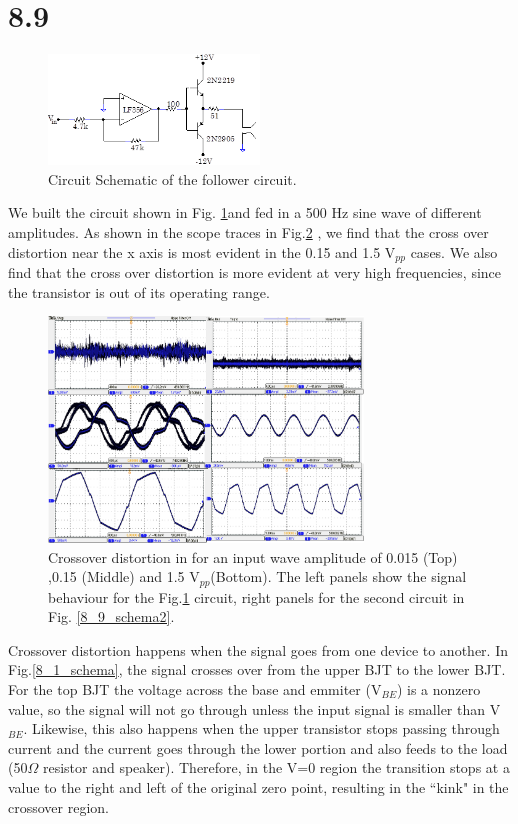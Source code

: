\documentclass[authoryear, 12pt,5p, times]{elsarticle}
\begin{document}
 \section*{8.9}
 \begin{figure}[h!]
 \centering
  \includegraphics[width=0.5\textwidth]{figure/8_9_schema.png}
\caption{Circuit Schematic of the follower circuit.}
\label{8_9_schema}
 \end{figure}
\par  We built the circuit shown in Fig. \ref{8_9_schema}and fed in a 500 Hz sine wave of different amplitudes. As shown in the scope traces in Fig.\ref{crossover} , we find that the cross over distortion near the x axis is most evident in the 0.15 and 1.5 V$_{pp}$ cases. We also find that the cross over distortion is more evident at very high frequencies, since the transistor is out of its operating range.
 \begin{figure}[h!]
  \includegraphics[width=\textwidth,height=6cm]{figure/crossover_scope.png}
\caption{Crossover distortion in for an input wave amplitude of 0.015 (Top) ,0.15 (Middle) and 1.5 V$_{pp}$(Bottom). The left panels show the signal behaviour for the Fig.\ref{8_9_schema} circuit, right panels for the second circuit in Fig. \ref{8_9_schema2}.}
\label{crossover}
\end{figure}
 \par Crossover distortion happens when the signal goes from one device to another. In Fig.\ref{8_1_schema}, the signal crosses over from the upper BJT to the lower BJT. For the top BJT  the voltage across the base and emmiter (V$_{BE}$) is a nonzero value, so the signal will not go through unless the input signal is smaller than V$_{BE}$. Likewise, this also happens when the upper transistor stops passing through current and the current goes through the lower portion and also feeds to the load (50$\Omega$ resistor and speaker). Therefore,  in the V=0 region the transition stops at a value to the right and left of the original zero point, resulting in the ``kink" in the crossover region.  
\end{document}
